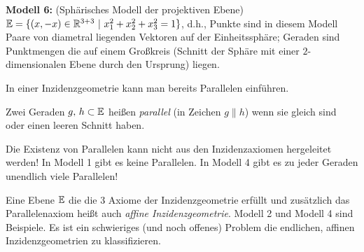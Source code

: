 {\bf Modell 6:} (\glqq Sphärisches Modell der projektiven Ebene\grqq )\\
$\mathbb E=\{ (x,-x)\in\mathbb R^{3+3} \ | \ x_1^2+  x_2^2 + x_3^2= 1 \}$, d.h.,
Punkte sind in diesem Modell Paare von diametral liegenden Vektoren auf der
Einheitssphäre;
Geraden sind Punktmengen die auf einem Großkreis (Schnitt der Sphäre
mit einer $2$-dimensionalen Ebene durch den Ursprung) liegen.

\bigskip

In einer Inzidenzgeometrie kann man bereits Parallelen einführen.

\begin{defi}[Parallelität]
Zwei Geraden $g,\,h \subset \mathbb E$ heißen {\em parallel} (in Zeichen $g\|h$)
wenn sie gleich sind oder einen leeren Schnitt haben.
\end{defi}

Die Existenz von Parallelen kann nicht aus den Inzidenzaxiomen hergeleitet werden! In Modell 1 gibt
es keine Parallelen. In Modell 4 gibt es zu jeder Geraden unendlich viele Parallelen!



Eine Ebene $\mathbb E$ die die 3 Axiome der Inzidenzgeometrie erfüllt und zusätzlich das Parallelenaxiom
heißt auch {\em affine Inzidenzgeometrie}.  Modell 2 und Modell 4 sind Beispiele. Es ist ein
schwieriges (und noch offenes) Problem die endlichen, affinen Inzidenzgeometrien zu klassifizieren.

%

